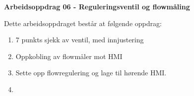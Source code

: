
\noindent
{\bf Arbeidsoppdrag 06 - Reguleringsventil og flowmåling}

\vskip 5pt


Dette arbeidsoppdraget består at følgende oppdrag:
\begin{enumerate}
	\item 7 punkts sjekk av ventil, med innjustering
	\item Oppkobling av flowmåler mot HMI 
	\item Sette opp flowregulering og lage til hørende HMI. 
	\item 
\end{enumerate}
\vskip 5pt



